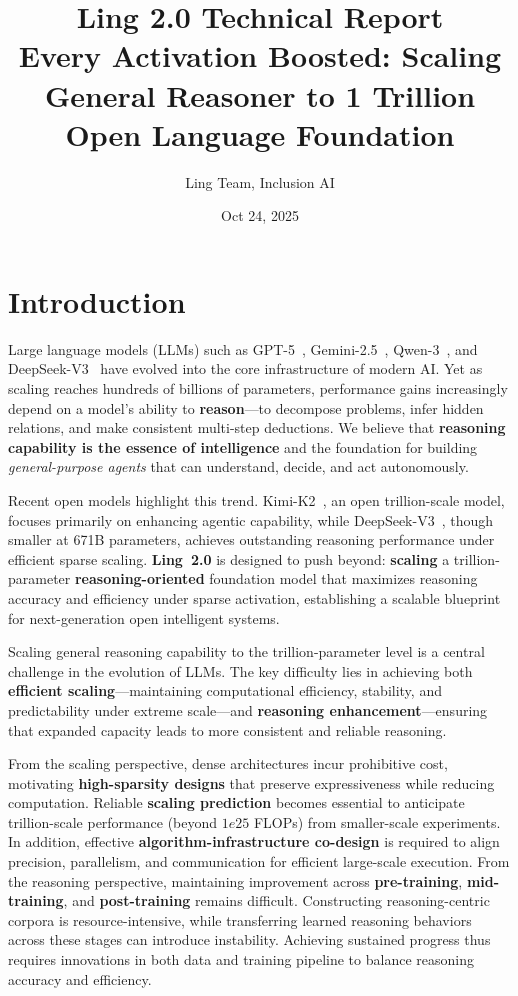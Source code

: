 \documentclass[table]{gtech}
\title{
\Large{\textcolor[HTML]{0369ff}{Ling 2.0} Technical Report} \\ [0.5em]
\huge{\textcolor[HTML]{0369ff}{Every Activation Boosted}: Scaling General Reasoner to 1 Trillion Open Language Foundation}
}
\author[*]{Ling Team, Inclusion AI}
\date{Oct 24, 2025\vspace{-1mm}}
\theoremstyle{definition}
\begin{document}
\maketitle

\section{Introduction}

Large language models (LLMs) such as GPT-5~\citep{openai2025gpt5}, Gemini-2.5~\citep{comanici2025gemini}, Qwen-3~\citep{qwen3}, and DeepSeek-V3~\citep{deepseekai2024deepseekv3technicalreport} have evolved into the core infrastructure of modern AI. 
Yet as scaling reaches hundreds of billions of parameters, performance gains increasingly depend on a model’s ability to \textbf{reason}—to decompose problems, infer hidden relations, and make consistent multi-step deductions. 
We believe that \textbf{reasoning capability is the essence of intelligence} and the foundation for building \textit{general-purpose agents} that can understand, decide, and act autonomously.

Recent open models highlight this trend. Kimi-K2~\citep{kimiK2}, an open trillion-scale model, focuses primarily on enhancing agentic capability, while DeepSeek-V3~\citep{deepseekai2024deepseekv3technicalreport}, though smaller at 671B parameters, achieves outstanding reasoning performance under efficient sparse scaling. 
{\textbf{Ling~2.0}} is designed to push beyond: \textbf{scaling} a trillion-parameter \textbf{reasoning-oriented} foundation model that maximizes reasoning accuracy and efficiency under sparse activation, establishing a scalable blueprint for next-generation open intelligent systems.

Scaling general reasoning capability to the trillion-parameter level is a central challenge in the evolution of LLMs. 
The key difficulty lies in achieving both \textbf{efficient scaling}—maintaining computational efficiency, stability, and predictability under extreme scale—and \textbf{reasoning enhancement}—ensuring that expanded capacity leads to more consistent and reliable reasoning.

From the scaling perspective, dense architectures incur prohibitive cost, motivating \textbf{high-sparsity designs} that preserve expressiveness while reducing computation. 
Reliable \textbf{scaling prediction} becomes essential to anticipate trillion-scale performance (beyond $1e25$ FLOPs) from smaller-scale experiments. 
In addition, effective \textbf{algorithm-infrastructure co-design} is required to align precision, parallelism, and communication for efficient large-scale execution. 
From the reasoning perspective, maintaining improvement across \textbf{pre-training}, \textbf{mid-training}, and \textbf{post-training} remains difficult. 
Constructing reasoning-centric corpora is resource-intensive, while transferring learned reasoning behaviors across these stages can introduce instability. 
Achieving sustained progress thus requires innovations in both data and training pipeline to balance reasoning accuracy and efficiency. 
\end{document}
